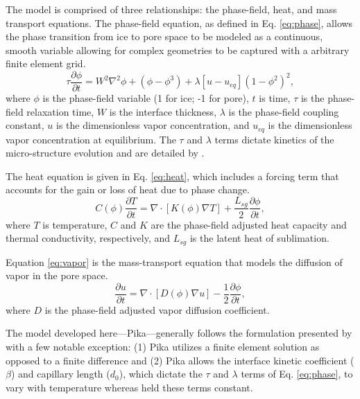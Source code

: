 The model is comprised of three relationships: the phase-field, heat, and mass transport equations. The phase-field equation, as defined in Eq. \eqref{eq:phase}, allows the phase transition from ice to pore space to be modeled as a continuous, smooth variable allowing for complex geometries to be captured with a arbitrary finite element grid.
\begin{equation}\label{eq:phase}
\tau \frac{\partial \phi}{\partial t} = W^2 \nabla^2 \phi +(\phi-\phi^3)+\lambda[u-u_{eq}](1-\phi^2)^2,
\end{equation}
where $\phi$ is the phase-field variable (1 for ice; -1 for pore), $t$ is time, $\tau$ is the phase-field relaxation time, $W$ is the interface thickness, $\lambda$ is the phase-field coupling constant, $u$ is the dimensionless vapor concentration, and $u_{eq}$ is the dimensionless vapor concentration at equilibrium. The $\tau$ and $\lambda$ terms dictate kinetics of the micro-structure evolution and are detailed by \citet{kaempfer2009phase}.

The heat equation is given in Eq. \eqref{eq:heat}, which includes a forcing term that accounts for the gain or loss of heat due to phase change.
\begin{equation}\label{eq:heat}
C(\phi)\frac{\partial T}{\partial t} = \nabla \cdot [K(\phi) \nabla T] + \frac{L_{sg}}{2}\frac{\partial \phi}{\partial t},
\end{equation}
where $T$ is temperature, $C$ and $K$ are the phase-field adjusted heat capacity and thermal conductivity, respectively, and $L_{sg}$ is the latent heat of sublimation.

Equation \ref{eq:vapor} is the mass-transport equation that models the diffusion of vapor in the pore space.
\begin{equation}\label{eq:vapor}
\frac{\partial u}{\partial t} = \nabla \cdot[ D(\phi) \nabla u] - \frac{1}{2}\frac{\partial \phi}{\partial t},
\end{equation}
where $D$ is the phase-field adjusted vapor diffusion coefficient.

The model developed here---Pika---generally follows the formulation presented by \citet{kaempfer2009phase} with a few notable exception: (1) Pika utilizes a finite element solution as opposed to a finite difference and (2) Pika allows the interface kinetic coefficient ($\beta$) and capillary length ($d_0$), which dictate the $\tau$ and $\lambda$ terms of Eq. \eqref{eq:phase}, to vary with temperature whereas \citet{kaempfer2009phase} held these terms constant.

